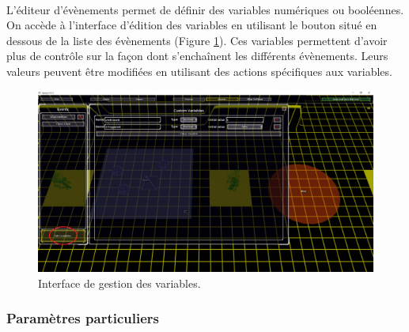 \documentclass[a4paper]{article}
\begin{document}
\paragraph{ }
L'éditeur d'évènements permet de définir des variables numériques ou booléennes. On accède à l'interface d'édition des variables en utilisant le bouton situé en dessous de la liste des évènements (Figure \ref{fig:editor-variables}). Ces variables permettent d'avoir plus de contrôle sur la façon dont s'enchaînent les différents évènements. Leurs valeurs peuvent être modifiées en utilisant des actions spécifiques aux variables.
\begin{figure}[H]
\centering
\includegraphics[width=\linewidth]{editor-variables.png}
\caption{Interface de gestion des variables.}
\label{fig:editor-variables}
\end{figure}
\subsubsection{Paramètres particuliers}
\end{document}
